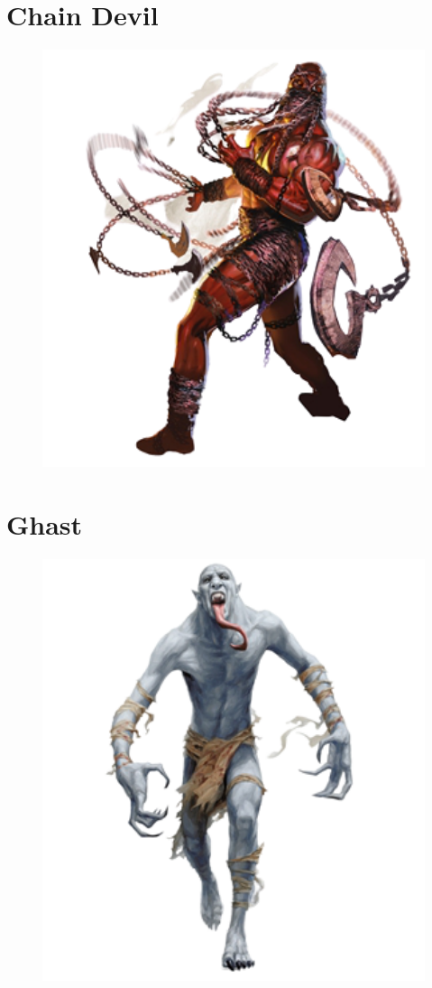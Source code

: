 \documentclass[oneside]{clgrammar}
\begin{document}
\newpage

\section{Chain Devil}
\begin{figure}[h!]
\centering
\includegraphics[width=350pt]{images/monstros/chain_devil-removebg-preview.png}
\end{figure}

\newpage

\section{Ghast}
\begin{figure}[h!]
\centering
\includegraphics[width=350pt]{images/monstros/ghast-removebg-preview.png}
\end{figure}
\end{document}
